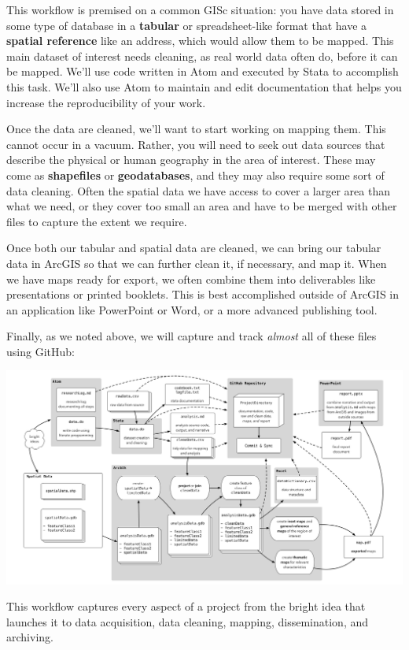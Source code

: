 \documentclass[]{book}
\theoremstyle{definition}
\theoremstyle{definition}
\theoremstyle{definition}
\theoremstyle{remark}
\begin{document}
This workflow is premised on a common GISc situation: you have data
stored in some type of database in a \textbf{tabular} or
spreadsheet-like format that have a \textbf{spatial reference} like an
address, which would allow them to be mapped. This main dataset of
interest needs cleaning, as real world data often do, before it can be
mapped. We'll use code written in Atom and executed by Stata to
accomplish this task. We'll also use Atom to maintain and edit
documentation that helps you increase the reproducibility of your work.

Once the data are cleaned, we'll want to start working on mapping them.
This cannot occur in a vacuum. Rather, you will need to seek out data
sources that describe the physical or human geography in the area of
interest. These may come as \textbf{shapefiles} or
\textbf{geodatabases}, and they may also require some sort of data
cleaning. Often the spatial data we have access to cover a larger area
than what we need, or they cover too small an area and have to be merged
with other files to capture the extent we require.

Once both our tabular and spatial data are cleaned, we can bring our
tabular data in ArcGIS so that we can further clean it, if necessary,
and map it. When we have maps ready for export, we often combine them
into deliverables like presentations or printed booklets. This is best
accomplished outside of ArcGIS in an application like PowerPoint or
Word, or a more advanced publishing tool.

Finally, as we noted above, we will capture and track \emph{almost} all
of these files using GitHub:

\includegraphics[width=1\linewidth]{images/gisFlow2}

This workflow captures every aspect of a project from the bright idea
that launches it to data acquisition, data cleaning, mapping,
dissemination, and archiving.
\end{document}
